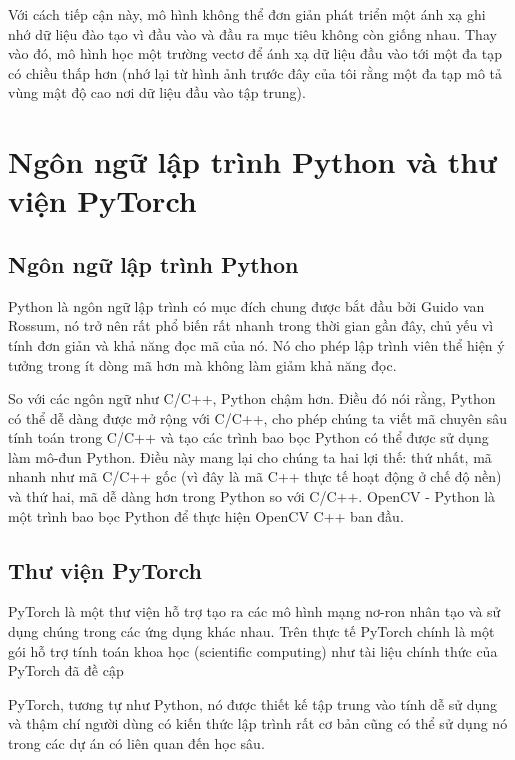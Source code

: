 Với cách tiếp cận này, mô hình không thể đơn giản
phát triển một ánh xạ ghi nhớ dữ liệu đào tạo vì đầu vào và đầu
ra mục tiêu không còn giống nhau. Thay vào đó, mô
hình học một trường vectơ để ánh xạ dữ liệu đầu vào tới một đa
tạp có chiều thấp hơn (nhớ lại từ hình ảnh trước đây của tôi rằng
một đa tạp mô tả vùng mật độ cao nơi dữ liệu đầu vào tập trung).

\section{Ngôn ngữ lập trình Python và thư viện PyTorch}

\subsection{Ngôn ngữ lập trình Python}

Python là ngôn ngữ lập trình có mục đích chung được bắt đầu bởi Guido van Rossum,
nó trở nên rất phổ biến rất nhanh trong thời gian gần đây, chủ yếu vì tính đơn giản
và khả năng đọc mã của nó. Nó cho phép lập trình viên thể hiện ý tưởng trong ít dòng
mã hơn mà không làm giảm khả năng đọc.

So với các ngôn ngữ như C/C++, Python chậm hơn. Điều đó nói rằng, Python có thể dễ dàng
được mở rộng với C/C++, cho phép chúng ta viết mã chuyên sâu tính toán trong C/C++
và tạo các trình bao bọc Python có thể được sử dụng làm mô-đun Python.
Điều này mang lại cho chúng ta hai lợi thế: thứ nhất, mã nhanh như mã C/C++ gốc
(vì đây là mã C++ thực tế hoạt động ở chế độ nền) và thứ hai, mã dễ dàng hơn trong
Python so với C/C++. OpenCV - Python là một trình bao bọc Python để thực hiện OpenCV C++
ban đầu.

\subsection{Thư viện PyTorch}

PyTorch là một thư viện hỗ trợ tạo ra các mô hình mạng nơ-ron nhân tạo và sử
dụng chúng trong các ứng dụng khác nhau. Trên thực tế PyTorch chính là một
gói hỗ trợ tính toán khoa học (scientific computing) như tài liệu chính
thức của PyTorch đã đề cập

PyTorch, tương tự như Python, nó được thiết kế tập trung vào tính dễ
sử dụng và thậm chí người dùng có kiến thức lập trình rất cơ bản cũng có thể
sử dụng nó trong các dự án có liên quan đến học sâu.


